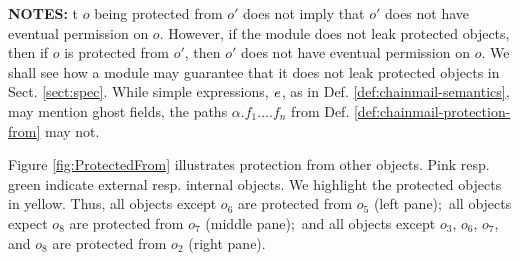  \noindent
 {\textbf{NOTES:}  \notesep t $o$ being protected from $o'$ does not imply that $o'$ does not have eventual permission on $o$. However, if the module does not leak protected objects, then if  $o$ is protected from $o'$, then $o'$ does not have eventual permission on $o$. We shall  see how a module may guarantee that it does not leak protected objects in Sect. \ref{sect:spec}.
\notesep While simple expressions, $\mathit{e}$, as in Def. \ref{def:chainmail-semantics},  may mention ghost fields,   the paths $\alpha.f_1....f_n$ 
 from Def. \ref{def:chainmail-protection-from} may not. %


Figure \ref{fig:ProtectedFrom} illustrates  protection from other objects. Pink resp. green indicate external resp. internal objects.
We highlight the protected objects in yellow. Thus, all objects except $o_6$ are protected from $o_5$ (left pane);\ all objects expect $o_8$ are protected from $o_7$ (middle pane);\ and all objects except $o_3$, $o_6$, $o_7$, and $o_8$ are protected from $o_2$ (right pane). 


}
